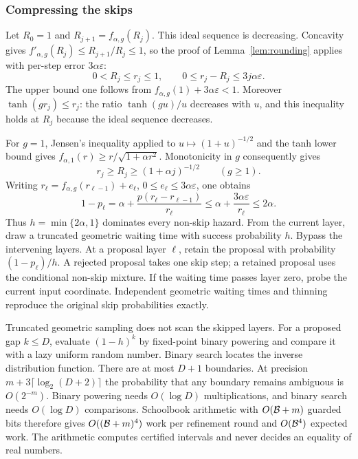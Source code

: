 \subsubsection{Compressing the skips}

Let $R_0=1$ and $R_{j+1}=f_{\alpha,g}(R_j)$.
This ideal sequence is decreasing. Concavity gives
$f'_{\alpha,g}(R_j)\le R_{j+1}/R_j\le1$, so the proof of
Lemma~\ref{lem:rounding} applies with per-step error
$3\alpha\varepsilon$:
\begin{equation}\label{eq:resroundingerror}
0< R_j\le r_j\le1,
\qquad 0\le r_j-R_j\le3j\alpha\varepsilon.
\end{equation}
The upper bound one follows from
$f_{\alpha,g}(1)+3\alpha\varepsilon<1$.
Moreover $\tanh(gr_j)\le r_j$: the ratio
$\tanh(gu)/u$ decreases with $u$, and this inequality holds at
$R_j$ because the ideal sequence decreases.

For $g=1$, Jensen's inequality applied to
$u\mapsto(1+u)^{-1/2}$ and the tanh lower bound gives
$f_{\alpha,1}(r)\ge r/\sqrt{1+\alpha r^2}$.
Monotonicity in $g$ consequently gives
\begin{equation}\label{eq:resradiuslower}
r_j\ge R_j\ge(1+\alpha j)^{-1/2}\qquad(g\ge1).
\end{equation}
Writing $r_\ell=f_{\alpha,g}(r_{\ell-1})+e_\ell$,
$0\le e_\ell\le3\alpha\varepsilon$, one obtains
\[
1-p_\ell
=\alpha+\frac{p(r_\ell-r_{\ell-1})}{r_\ell}
\le\alpha+\frac{3\alpha\varepsilon}{r_\ell}
\le2\alpha.
\]
Thus $h=\min\{2\alpha,1\}$ dominates every non-skip hazard.
From the current layer, draw a truncated geometric waiting time
with success probability $h$. Bypass the intervening layers.
At a proposal layer $\ell$, retain the proposal with probability
$(1-p_\ell)/h$. A rejected proposal takes one skip step; a retained
proposal uses the conditional non-skip mixture. If the waiting time
passes layer zero, probe the current input coordinate.
Independent geometric waiting times and thinning reproduce the
original skip probabilities exactly.

Truncated geometric sampling does not scan the skipped layers.
For a proposed gap $k\le D$, evaluate $(1-h)^k$ by fixed-point
binary powering and compare it with a lazy uniform random number.
Binary search locates the inverse distribution function.
There are at most $D+1$ boundaries. At precision
$m+3\lceil\log_2(D+2)\rceil$ the probability that any boundary
remains ambiguous is $O(2^{-m})$.
Binary powering needs $O(\log D)$ multiplications, and binary search
needs $O(\log D)$ comparisons. Schoolbook arithmetic with
$O(\mathcal B+m)$ guarded bits therefore gives $O((\mathcal B+m)^4)$ work per
refinement round and $O(\mathcal B^4)$ expected work.
The arithmetic computes certified intervals and never decides an
equality of real numbers.

